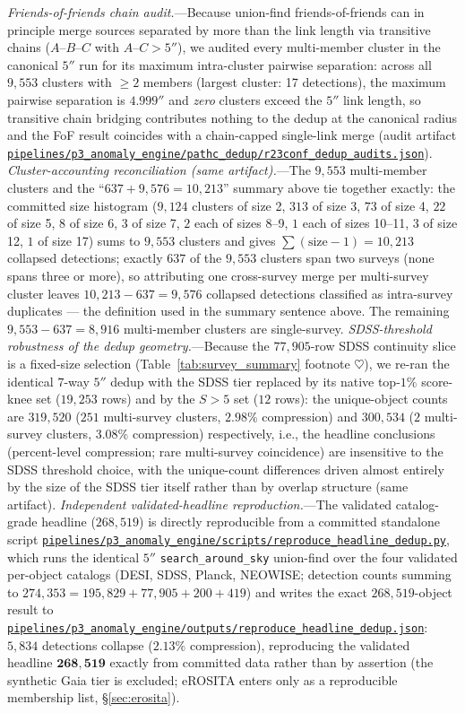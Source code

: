 \documentclass[aps,prd,twocolumn,superscriptaddress,showpacs,preprintnumbers,nofootinbib,longbibliography,floatfix]{revtex4-2}
\newcommand{\repoBase}{https://github.com/Hubify-Projects/bigbounce/blob/main}
\newcommand{\artifact}[1]{\href{\repoBase/#1}{\nolinkurl{#1}}}
\begin{document}
\textit{Friends-of-friends chain audit.}---Because union-find friends-of-friends can in principle merge sources separated by more than the link length via transitive chains ($A$--$B$--$C$ with $A$--$C > 5''$), we audited every multi-member cluster in the canonical $5''$ run for its maximum intra-cluster pairwise separation: across all $9{,}553$ clusters with $\geq 2$ members (largest cluster: 17 detections), the maximum pairwise separation is $4.999''$ and \emph{zero} clusters exceed the $5''$ link length, so transitive chain bridging contributes nothing to the dedup at the canonical radius and the FoF result coincides with a chain-capped single-link merge (audit artifact \artifact{pipelines/p3\_anomaly\_engine/pathc\_dedup/r23conf\_dedup\_audits.json}). \textit{Cluster-accounting reconciliation (same artifact).}---The $9{,}553$ multi-member clusters and the ``$637 + 9{,}576 = 10{,}213$'' summary above tie together exactly: the committed size histogram ($9{,}124$ clusters of size 2, $313$ of size 3, $73$ of size 4, $22$ of size 5, $8$ of size 6, $3$ of size 7, $2$ each of sizes 8--9, $1$ each of sizes 10--11, $3$ of size 12, $1$ of size 17) sums to $9{,}553$ clusters and gives $\sum(\mathrm{size}-1) = 10{,}213$ collapsed detections; exactly $637$ of the $9{,}553$ clusters span two surveys (none spans three or more), so attributing one cross-survey merge per multi-survey cluster leaves $10{,}213 - 637 = 9{,}576$ collapsed detections classified as intra-survey duplicates --- the definition used in the summary sentence above. The remaining $9{,}553 - 637 = 8{,}916$ multi-member clusters are single-survey. \textit{SDSS-threshold robustness of the dedup geometry.}---Because the $77{,}905$-row SDSS continuity slice is a fixed-size selection (Table~\ref{tab:survey_summary} footnote $\heartsuit$), we re-ran the identical $7$-way $5''$ dedup with the SDSS tier replaced by its native top-$1\%$ score-knee set ($19{,}253$ rows) and by the $S>5$ set ($12$ rows): the unique-object counts are $319{,}520$ ($251$ multi-survey clusters, $2.98\%$ compression) and $300{,}534$ ($2$ multi-survey clusters, $3.08\%$ compression) respectively, i.e., the headline conclusions (percent-level compression; rare multi-survey coincidence) are insensitive to the SDSS threshold choice, with the unique-count differences driven almost entirely by the size of the SDSS tier itself rather than by overlap structure (same artifact). \textit{Independent validated-headline reproduction.}---The validated catalog-grade headline ($268{,}519$) is directly reproducible from a committed standalone script \artifact{pipelines/p3\_anomaly\_engine/scripts/reproduce\_headline\_dedup.py}, which runs the identical $5''$ \texttt{search\_around\_sky} union-find over the four validated per-object catalogs (DESI, SDSS, Planck, NEOWISE; detection counts summing to $274{,}353 = 195{,}829 + 77{,}905 + 200 + 419$) and writes the exact $268{,}519$-object result to \artifact{pipelines/p3\_anomaly\_engine/outputs/reproduce\_headline\_dedup.json}: $5{,}834$ detections collapse ($2.13\%$ compression), reproducing the validated headline $\mathbf{268{,}519}$ exactly from committed data rather than by assertion (the synthetic Gaia tier is excluded; eROSITA enters only as a reproducible membership list, \S\ref{sec:erosita}).
\end{document}
